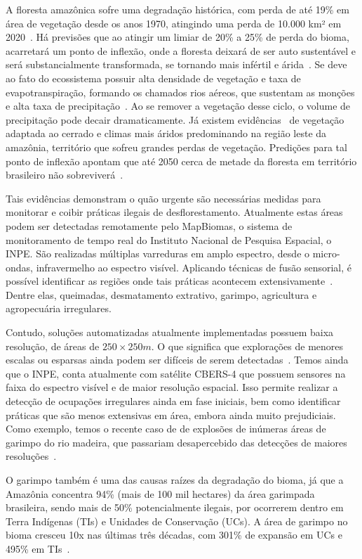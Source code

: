 A floresta amazônica sofre uma degradação histórica, com perda de até 19\% em área de vegetação desde os anos 1970, atingindo uma perda de 10.000 km² em 2020~\cite{ignacioNature}. Há previsões que ao atingir um limiar de 20\% a 25\% de perda do bioma, acarretará um ponto de inflexão, onde a floresta deixará de ser auto sustentável e será substancialmente transformada, se tornando mais infértil e árida~\cite{LovejoyTipping}. Se deve ao fato do ecossistema possuir alta densidade de vegetação e  taxa de evapotranspiração, formando os chamados rios aéreos, que sustentam as monções e alta taxa de precipitação~\cite{satyamurty2013moisture}. Ao se remover a vegetação desse ciclo, o volume de  precipitação pode decair dramaticamente. Já existem evidências~\cite{ignacioNature} de vegetação adaptada ao cerrado e climas mais áridos predominando na região leste da amazônia, território que sofreu grandes perdas de vegetação. Predições para tal ponto de inflexão apontam que até 2050 cerca de metade da floresta em território brasileiro não sobreviverá~\cite{LovejoyTipping}.

Tais evidências demonstram o quão urgente são necessárias medidas para monitorar e coibir práticas ilegais de desflorestamento. Atualmente estas áreas podem ser detectadas remotamente pelo MapBiomas, o sistema de monitoramento de tempo real do Instituto Nacional de Pesquisa Espacial, o INPE. São realizadas múltiplas varreduras em amplo espectro, desde o micro-ondas, infravermelho ao espectro visível. Aplicando técnicas de fusão sensorial, é possível identificar as regiões onde tais práticas acontecem extensivamente~\cite{inpe_deter}. Dentre elas, queimadas, desmatamento extrativo, garimpo, agricultura e agropecuária irregulares.

Contudo, soluções automatizadas atualmente implementadas possuem baixa resolução, de áreas de $250\times250m$. O que significa que explorações de menores escalas ou esparsas ainda podem ser difíceis de serem detectadas~\cite{mapbiomasgarimpo}. Temos ainda que o INPE, conta atualmente com satélite CBERS-4 que possuem sensores na faixa do espectro visível e de maior resolução espacial. Isso permite realizar a detecção de ocupações irregulares ainda em fase iniciais, bem como identificar práticas que são menos extensivas em área, embora ainda muito prejudiciais. Como exemplo, temos o recente caso de de explosões de inúmeras áreas de garimpo do rio madeira, que passariam desapercebido das detecções de maiores resoluções~\cite{mapbiomasgarimpo}.


O garimpo também é uma das causas raízes da degradação do bioma, já que a Amazônia concentra 94\% (mais de 100 mil hectares) da área garimpada brasileira, sendo mais de 50\% potencialmente ilegais, por ocorrerem dentro em Terra Indígenas (TIs) e Unidades de Conservação (UCs). A área de garimpo no bioma cresceu 10x nas últimas três décadas, com 301\% de expansão em UCs e 495\% em TIs~\cite{mapbiomasgarimpo}.


